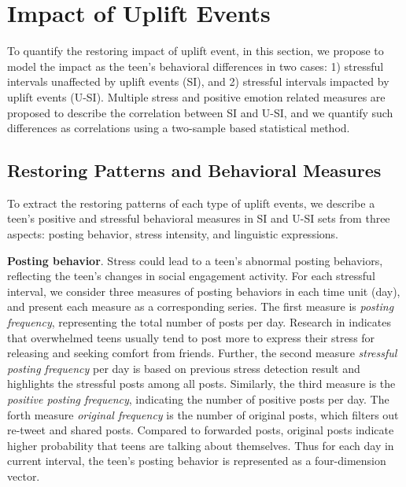 \section{Impact of Uplift Events}
\label{sec:impact}
To quantify the restoring impact of uplift event,
in this section, we propose to model the impact as the teen's behavioral differences in two cases:
1) stressful intervals unaffected by uplift events (SI), and 2) stressful intervals impacted by uplift events (U-SI).
Multiple stress and positive emotion related measures are proposed to describe the correlation between SI and U-SI,
and we quantify such differences as correlations using a two-sample based statistical method.

\subsection{Restoring Patterns and Behavioral Measures}
\label{subsec:pattern}
To extract the restoring patterns of each type of uplift events,
we describe a teen's positive and stressful behavioral measures in SI and U-SI sets from three aspects:
posting behavior, stress intensity, and linguistic expressions.

\textbf{Posting behavior}.
Stress could lead to a teen's abnormal posting behaviors,
reflecting the teen's changes in social engagement activity.
For each stressful interval,
we consider three measures of posting behaviors in each time unit (day),
and present each measure as a corresponding series.
The first measure is \emph{posting frequency},
representing the total number of posts per day.
Research in \cite{Li2017Analyzing} indicates that overwhelmed teens usually tend to post more to express their stress for releasing
and seeking comfort from friends.
Further, the second measure \emph{stressful posting frequency} per day
is based on previous stress detection result and highlights the stressful posts among all posts.
Similarly, the third measure is the \emph{positive posting frequency}, indicating the number of positive posts per day.
The forth measure \emph{original frequency} is the number of original posts, which filters out re-tweet and shared posts.
Compared to forwarded posts, original posts indicate higher probability that teens are talking about themselves.
Thus for each day in current interval, the teen's posting behavior is represented as a four-dimension vector.

